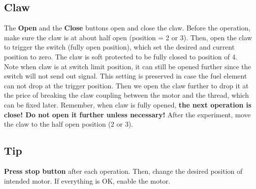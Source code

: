 \documentclass[review,number,sort&compress]{elsarticle}
\begin{document}
\subsection{Claw}
The \textbf{Open} and the \textbf{Close} buttons open and close the claw.
Before the operation, make sure the claw is at about half open (position = 2 or 3).
Then, open the claw to trigger the switch (fully open position), which set the desired and current position to zero.
The claw is soft protected to be fully closed to position of 4.
Note when claw is at switch limit position, it can still be opened further since the switch will not send out signal.
This setting is preserved in case the fuel element can not drop at the trigger position.
Then we open the claw further to drop it at the price of breaking the claw coupling between the motor and the thread, which can be fixed later.
Remember, when claw is fully opened, \textbf{the next operation is close! Do not open it further unless necessary!}
After the experiment, move the claw to the half open position (2 or 3).

\subsection{Tip}
\textbf{Press stop button} after each operation. Then, change the desired position of intended motor. If everything is OK, enable the motor.













%  
% 
\end{document}
